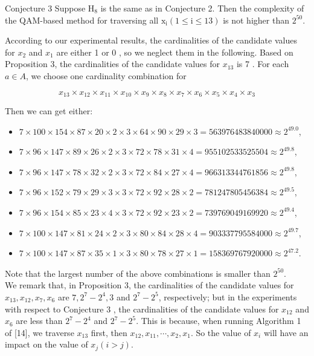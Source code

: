\documentclass[10pt]{article}
\begin{document}
Conjecture 3 Suppose $\mathrm{H}_{8}$ is the same as in Conjecture 2. Then the complexity of the QAM-based method for traversing all $\mathrm{x}_{\mathrm{i}}(1 \leq \mathrm{i} \leq 13)$ is not higher than $2^{50}$.

According to our experimental results, the cardinalities of the candidate values for $x_{2}$ and $x_{1}$ are either 1 or 0 , so we neglect them in the following. Based on Proposition 3, the cardinalities of the candidate values for $x_{13}$ is 7 . For each $a \in A$, we choose one cardinality combination for

$$
x_{13} \times x_{12} \times x_{11} \times x_{10} \times x_{9} \times x_{8} \times x_{7} \times x_{6} \times x_{5} \times x_{4} \times x_{3}
$$

Then we can get either:

\begin{itemize}
  \item $7 \times 100 \times 154 \times 87 \times 20 \times 2 \times 3 \times 64 \times 90 \times 29 \times 3=563976483840000 \approx 2^{49.0}$,
  \item $7 \times 96 \times 147 \times 89 \times 26 \times 2 \times 3 \times 72 \times 78 \times 31 \times 4=955102533525504 \approx 2^{49.8}$,
  \item $7 \times 96 \times 147 \times 78 \times 32 \times 2 \times 3 \times 72 \times 84 \times 27 \times 4=966313344761856 \approx 2^{49.8}$,
  \item $7 \times 96 \times 152 \times 79 \times 29 \times 3 \times 3 \times 72 \times 92 \times 28 \times 2=781247805456384 \approx 2^{49.5}$,
  \item $7 \times 96 \times 154 \times 85 \times 23 \times 4 \times 3 \times 72 \times 92 \times 23 \times 2=739769049169920 \approx 2^{49.4}$,
  \item $7 \times 100 \times 147 \times 81 \times 24 \times 2 \times 3 \times 80 \times 84 \times 28 \times 4=903337795584000 \approx 2^{49.7}$,
  \item $7 \times 100 \times 147 \times 87 \times 35 \times 1 \times 3 \times 80 \times 78 \times 27 \times 1=158369767920000 \approx 2^{47.2}$.
\end{itemize}

Note that the largest number of the above combinations is smaller than $2^{50}$.\\
We remark that, in Proposition 3, the cardinalities of the candidate values for $x_{13}, x_{12}, x_{7}, x_{6}$ are $7,2^{7}-2^{4}, 3$ and $2^{7}-2^{5}$, respectively; but in the experiments with respect to Conjecture 3 , the cardinalities of the candidate values for $x_{12}$ and $x_{6}$ are less than $2^{7}-2^{4}$ and $2^{7}-2^{5}$. This is because, when running Algorithm 1 of [14], we traverse $x_{13}$ first, then $x_{12}, x_{11}, \cdots, x_{2}, x_{1}$. So the value of $x_{i}$ will have an impact on the value of $x_{j}(i>j)$.
\end{document}
